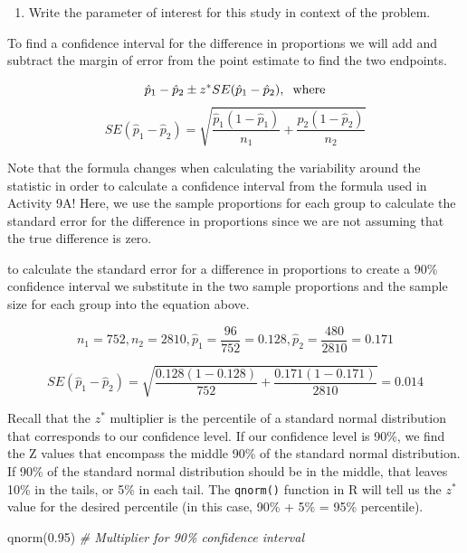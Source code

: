 \documentclass[
]{report}
\newenvironment{Shaded}{\begin{snugshade}}{\end{snugshade}}
\newcommand{\CommentTok}[1]{\textcolor[rgb]{0.56,0.35,0.01}{\textit{#1}}}
\newcommand{\FloatTok}[1]{\textcolor[rgb]{0.00,0.00,0.81}{#1}}
\newcommand{\FunctionTok}[1]{\textcolor[rgb]{0.00,0.00,0.00}{#1}}
\newcommand{\NormalTok}[1]{#1}
\providecommand{\tightlist}{%
  \setlength{\itemsep}{0pt}\setlength{\parskip}{0pt}}
\begin{document}
\begin{enumerate}
\def\labelenumi{\arabic{enumi}.}
\setcounter{enumi}{1}
\tightlist
\item
  Write the parameter of interest for this study in context of the problem.
\end{enumerate}

\vspace{0.8in}

To find a confidence interval for the difference in proportions we will add and subtract the margin of error from the point estimate to find the two endpoints.

\[\hat{p}_1-\hat{p}_2\pm z^*SE(\hat{p}_1-\hat{p}_2), \hspace{.2cm} \text{where}\]
\[SE(\hat{p}_1-\hat{p}_2) = \sqrt{\frac{\hat{p}_1 (1-\hat{p}_1)}{n_1}+\frac{\hat{p}_2 (1-\hat{p}_2)}{n_2}}\]

Note that the formula changes when calculating the variability around the statistic in order to calculate a confidence interval from the formula used in Activity 9A! Here, we use the sample proportions for each group to calculate the standard error for the difference in proportions since we are not assuming that the true difference is zero.

to calculate the standard error for a difference in proportions to create a 90\% confidence interval we substitute in the two sample proportions and the sample size for each group into the equation above.

\[n_1 = 752, n_2 = 2810, \hat{p}_1 = \frac{96}{752} = 0.128, \hat{p}_2 = \frac{480}{2810} = 0.171\]

\[SE(\hat{p}_1-\hat{p}_2) = \sqrt{\frac{0.128 (1-0.128)}{752}+\frac{0.171 (1-0.171)}{2810}} = 0.014\]

Recall that the \(z^*\) multiplier is the percentile of a standard normal distribution that corresponds to our confidence level. If our confidence level is 90\%, we find the Z values that encompass the middle 90\% of the standard normal distribution. If 90\% of the standard normal distribution should be in the middle, that leaves 10\% in the tails, or 5\% in each tail. The \texttt{qnorm()} function in R will tell us the \(z^*\) value for the desired percentile (in this case, 90\% + 5\% = 95\% percentile).

\begin{Shaded}
\begin{Highlighting}[]
\FunctionTok{qnorm}\NormalTok{(}\FloatTok{0.95}\NormalTok{) }\CommentTok{\# Multiplier for 90\% confidence interval}
\end{Highlighting}
\end{Shaded}
\end{document}
